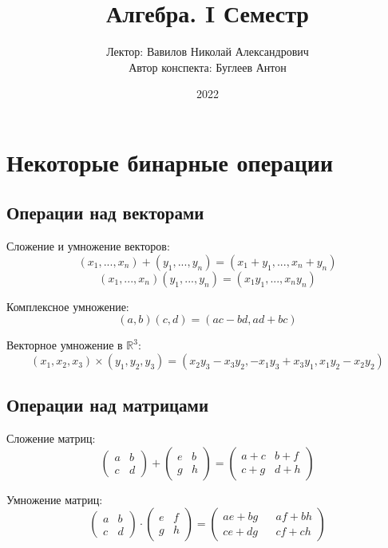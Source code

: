 \documentclass[a4paper, 14pt]{article}
\title{Алгебра. I Семестр}
\author{Лектор: Вавилов Николай Александрович \\
        Автор конспекта: Буглеев Антон}
\date{2022}
\begin{document}
    \maketitle
    \newpage

    \section{Некоторые бинарные операции}
    \subsection{Операции над векторами}
    Сложение и умножение векторов: 
    \[(x_1, ..., x_n) + (y_1, ..., y_n) = (x_1 + y_1, ..., x_n + y_n)\]
    \[(x_1, ..., x_n)(y_1, ..., y_n) = (x_1y_1, ..., x_ny_n)\]

    Комплексное умножение:
    \[(a,b)(c,d) = (ac - bd, ad+bc)\]

    Векторное умножение в $\mathbb{R}^3$:    
    \[ (x_1,x_2,x_3) \times (y_1,y_2,y_3) = (x_2y_3 - x_3y_2, -x_1y_3 + x_3y_1, x_1y_2 - x_2y_2)\]
    

    \subsection{Операции над матрицами}
    Сложение матриц:
    \[
    \begin{pmatrix}
        a & b \\
        c & d
    \end{pmatrix}
    +
    \begin{pmatrix}
        e & b \\
        g & h
    \end{pmatrix}
    =
    \begin{pmatrix}
        a+c & b+f \\
        c+g & d + h
    \end{pmatrix}
    \]

    Умножение матриц:
    \[
        \begin{pmatrix}
            a & b \\
            c & d    
        \end{pmatrix}
        \cdot
        \begin{pmatrix}
            e & f \\
            g & h
        \end{pmatrix}
        =
        \begin{pmatrix}
            ae+bg && af+bh \\
            ce+dg && cf+ch
        \end{pmatrix}
    \]
    
\end{document}
